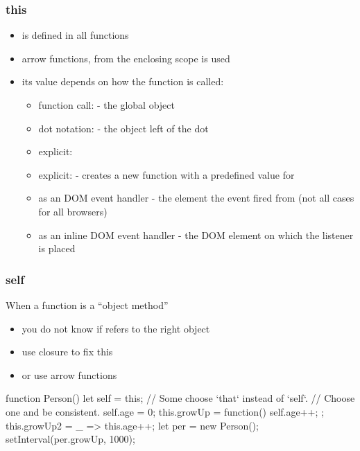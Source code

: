 \begin{frame}[fragile] \frametitle{this}
\begin{itemize}
  \item {} is defined in all functions
  \item arrow functions,  from the enclosing scope is used
  \item its value depends on how the function is called:
  \begin{itemize}
    \item function call:  - the global object
    \item dot notation:  - the object left of the dot
    \item explicit: 
    \item explicit:  - creates a new function with a predefined value for 
    \item as an DOM event handler - the element the event fired from (not all cases for all browsers)
    \item as an inline DOM event handler - the DOM element on which the listener is placed
  \end{itemize}
\end{itemize}
\end{frame}

\begin{frame}[fragile] \frametitle{self}
When a function is a ``object method''
\begin{itemize}
  \item you do not know if  refers to the right object
  \item use closure to fix this
  \item or use arrow functions
\end{itemize}
\begin{CodeBox}{}
function Person() {
  let self = this; // Some choose `that` instead of `self`. 
                         // Choose one and be consistent.
  self.age = 0;
  this.growUp = function() { self.age++; };
  this.growUp2 = _ =>  this.age++;
}
let per = new Person();
setInterval(per.growUp, 1000);
\end{CodeBox}
\end{frame}


